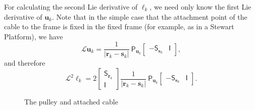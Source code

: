 \documentclass[reqno,12pt]{amsart}
\newcommand\starop[1]{\mathsf S_{#1}}
\begin{document}
For calculating the second Lie derivative of $\ell_k$, we need only know the first Lie derivative of $\bm u_k$.  Note that in the simple case that the attachment point of the cable to the frame is fixed in the fixed frame (for example, as in a Stewart Platform), we have
\begin{equation}
\label{L u_k - fixed}
\mathcal L \bm u_k =
\frac1{|\bm r_k - \bm s_k|} \ 
\mathsf P_{\bm u_k}
\begin{bmatrix} - \starop{\bm s_k} & \mathsf I
\end{bmatrix} ,
\end{equation}
and therefore
\begin{equation}
\label{L^2 ell_k - fixed}
\mathcal L^2 \ell_k =
2 \begin{bmatrix} \starop{\bm r_k} \\ \mathsf I \end{bmatrix}
\frac1{|\bm r_k - \bm s_k|} \ 
\mathsf P_{\bm u_k}
\begin{bmatrix} - \starop{\bm s_k} & \mathsf I
\end{bmatrix} .
\end{equation}

\begin{figure}


\caption{The pulley and attached cable}
\label{pulley}
\end{figure}
\end{document}
